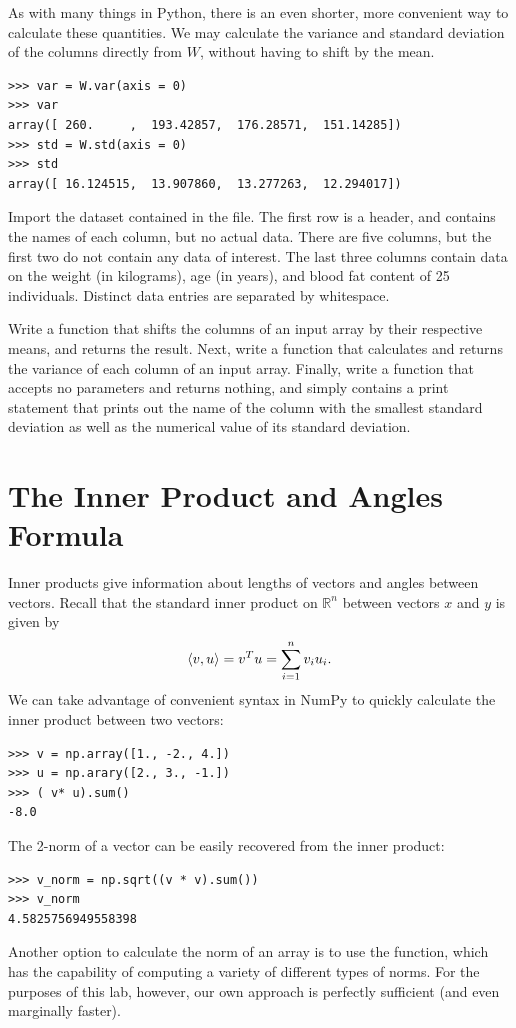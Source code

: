 As with many things in Python, there is an even shorter, more convenient way to calculate these quantities.
We may calculate the variance and standard deviation of the columns directly from $W$, without having to shift
by the mean.

\begin{lstlisting}
>>> var = W.var(axis = 0)
>>> var
array([ 260.     ,  193.42857,  176.28571,  151.14285])
>>> std = W.std(axis = 0)
>>> std
array([ 16.124515,  13.907860,  13.277263,  12.294017])
\end{lstlisting}

\begin{problem}
\label{prob:shiftdata}
Import the dataset contained in the  file. The first row is a header, and contains the names
of each column, but no actual data. There are five columns, but the first two do not contain any data of interest.
The last three columns contain data on the weight (in kilograms), age (in years), and blood fat content of 25
individuals. Distinct data entries are separated by whitespace.

Write a function  that shifts the columns of an input array by their respective means, and returns the result.
Next, write a function  that calculates and returns the variance of each column of an input array.
Finally, write a function  that accepts no parameters and returns nothing, and simply contains a print
statement that prints out the name of the column with the smallest standard deviation as well as the numerical value of
its standard deviation.

\end{problem}

\section*{The Inner Product and Angles Formula}

Inner products give information about lengths of vectors and angles between vectors.
Recall that the standard inner product on $\mathbb{R}^n$ between vectors $x$ and $y$ is given by
$$
\langle v,u \rangle = v^T u = \displaystyle\sum_{i=1}^n v_iu_i.
$$
We can take advantage of convenient syntax in NumPy to quickly calculate the inner product between two vectors:
\begin{lstlisting}
>>> v = np.array([1., -2., 4.])
>>> u = np.arary([2., 3., -1.])
>>> ( v* u).sum()
-8.0
\end{lstlisting}
The 2-norm of a vector can be easily recovered from the inner product:
\begin{lstlisting}
>>> v_norm = np.sqrt((v * v).sum())
>>> v_norm
4.5825756949558398
\end{lstlisting}
Another option to calculate the norm of an array is to use the  function, which has the
capability of computing a variety of different types of norms. For the purposes of this lab, however, our own
approach is perfectly sufficient (and even marginally faster).

